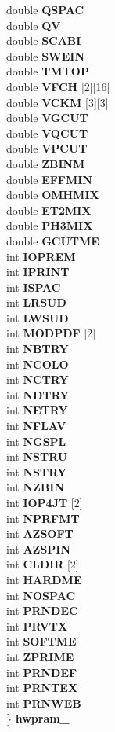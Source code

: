 \begin{CompactItemize}
\begin{tabbing}
\>double {\bf QSPAC}\\
\>double {\bf QV}\\
\>double {\bf SCABI}\\
\>double {\bf SWEIN}\\
\>double {\bf TMTOP}\\
\>double {\bf VFCH} [2][16]\\
\>double {\bf VCKM} [3][3]\\
\>double {\bf VGCUT}\\
\>double {\bf VQCUT}\\
\>double {\bf VPCUT}\\
\>double {\bf ZBINM}\\
\>double {\bf EFFMIN}\\
\>double {\bf OMHMIX}\\
\>double {\bf ET2MIX}\\
\>double {\bf PH3MIX}\\
\>double {\bf GCUTME}\\
\>int {\bf IOPREM}\\
\>int {\bf IPRINT}\\
\>int {\bf ISPAC}\\
\>int {\bf LRSUD}\\
\>int {\bf LWSUD}\\
\>int {\bf MODPDF} [2]\\
\>int {\bf NBTRY}\\
\>int {\bf NCOLO}\\
\>int {\bf NCTRY}\\
\>int {\bf NDTRY}\\
\>int {\bf NETRY}\\
\>int {\bf NFLAV}\\
\>int {\bf NGSPL}\\
\>int {\bf NSTRU}\\
\>int {\bf NSTRY}\\
\>int {\bf NZBIN}\\
\>int {\bf IOP4JT} [2]\\
\>int {\bf NPRFMT}\\
\>int {\bf AZSOFT}\\
\>int {\bf AZSPIN}\\
\>int {\bf CLDIR} [2]\\
\>int {\bf HARDME}\\
\>int {\bf NOSPAC}\\
\>int {\bf PRNDEC}\\
\>int {\bf PRVTX}\\
\>int {\bf SOFTME}\\
\>int {\bf ZPRIME}\\
\>int {\bf PRNDEF}\\
\>int {\bf PRNTEX}\\
\>int {\bf PRNWEB}\\
\} {\bf hwpram\_}\\

\end{tabbing}\end{CompactItemize}


